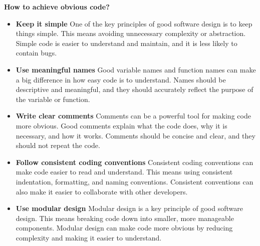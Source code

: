 \newpage 
{}

\textbf{How to achieve obvious code?}\newline
{
\begin{itemize}
	
\item \textbf{Keep it simple}\newline
	 One of the key principles of good software design is to keep things simple. This means avoiding unnecessary complexity or abstraction. Simple code is easier to understand and maintain, and it is less likely to contain bugs.\newline
\item \textbf{Use meaningful names}\newline
	 Good variable names and function names can make a big difference in how easy code is to understand. Names should be descriptive and meaningful, and they should accurately reflect the purpose of the variable or function.\newline
\newpage
\item \textbf{Write clear comments}\newline
 Comments can be a powerful tool for making code more obvious. Good comments explain what the code does, why it is necessary, and how it works. Comments should be concise and clear, and they should not repeat the code.\newline
\item \textbf{Follow consistent coding conventions}\newline
Consistent coding conventions can make code easier to read and understand. This means using consistent indentation, formatting, and naming conventions. Consistent conventions can also make it easier to collaborate with other developers.\newline
\newpage
\item \textbf{Use modular design}\newline
Modular design is a key principle of good software design. This means breaking code down into smaller, more manageable components. Modular design can make code more obvious by reducing complexity and making it easier to understand.\cite{Zhou:2018} \newline

\end{itemize}


}

